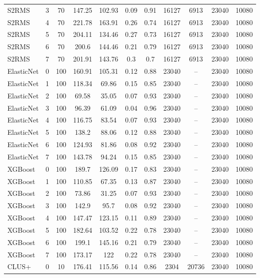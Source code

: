 \documentclass{article}
\begin{document}
\begin{appendices}
\begin{longtable}{l c c c c c c c c c c}
S2RMS & 3 & 70 & 147.25 & 102.93 & 0.09 & 0.91 & 16127 & 6913 & 23040 & 10080 \\ 
S2RMS & 4 & 70 & 221.78 & 163.91 & 0.26 & 0.74 & 16127 & 6913 & 23040 & 10080 \\ 
S2RMS & 5 & 70 & 204.11 & 134.46 & 0.27 & 0.73 & 16127 & 6913 & 23040 & 10080 \\ 
S2RMS & 6 & 70 & 200.6 & 144.46 & 0.21 & 0.79 & 16127 & 6913 & 23040 & 10080 \\ 
S2RMS & 7 & 70 & 201.91 & 143.76 & 0.3 & 0.7 & 16127 & 6913 & 23040 & 10080 \\ 
ElasticNet & 0 & 100 & 160.91 & 105.31 & 0.12 & 0.88 & 23040 & -- & 23040 & 10080 \\ 
ElasticNet & 1 & 100 & 118.34 & 69.86 & 0.15 & 0.85 & 23040 & -- & 23040 & 10080 \\ 
ElasticNet & 2 & 100 & 69.58 & 35.05 & 0.07 & 0.93 & 23040 & -- & 23040 & 10080 \\ 
ElasticNet & 3 & 100 & 96.39 & 61.09 & 0.04 & 0.96 & 23040 & -- & 23040 & 10080 \\ 
ElasticNet & 4 & 100 & 116.75 & 83.54 & 0.07 & 0.93 & 23040 & -- & 23040 & 10080 \\ 
ElasticNet & 5 & 100 & 138.2 & 88.06 & 0.12 & 0.88 & 23040 & -- & 23040 & 10080 \\ 
ElasticNet & 6 & 100 & 124.93 & 81.86 & 0.08 & 0.92 & 23040 & -- & 23040 & 10080 \\ 
ElasticNet & 7 & 100 & 143.78 & 94.24 & 0.15 & 0.85 & 23040 & -- & 23040 & 10080 \\ 
XGBoost & 0 & 100 & 189.7 & 126.09 & 0.17 & 0.83 & 23040 & -- & 23040 & 10080 \\ 
XGBoost & 1 & 100 & 110.85 & 67.35 & 0.13 & 0.87 & 23040 & -- & 23040 & 10080 \\ 
XGBoost & 2 & 100 & 73.86 & 31.25 & 0.07 & 0.93 & 23040 & -- & 23040 & 10080 \\ 
XGBoost & 3 & 100 & 142.9 & 95.7 & 0.08 & 0.92 & 23040 & -- & 23040 & 10080 \\ 
XGBoost & 4 & 100 & 147.47 & 123.15 & 0.11 & 0.89 & 23040 & -- & 23040 & 10080 \\ 
XGBoost & 5 & 100 & 182.64 & 103.52 & 0.22 & 0.78 & 23040 & -- & 23040 & 10080 \\ 
XGBoost & 6 & 100 & 199.1 & 145.16 & 0.21 & 0.79 & 23040 & -- & 23040 & 10080 \\ 
XGBoost & 7 & 100 & 173.17 & 122 & 0.22 & 0.78 & 23040 & -- & 23040 & 10080 \\ 
CLUS+ & 0 & 10 & 176.41 & 115.56 & 0.14 & 0.86 & 2304 & 20736 & 23040 & 10080 \\ 

\end{longtable}
\end{appendices}
\end{document}
